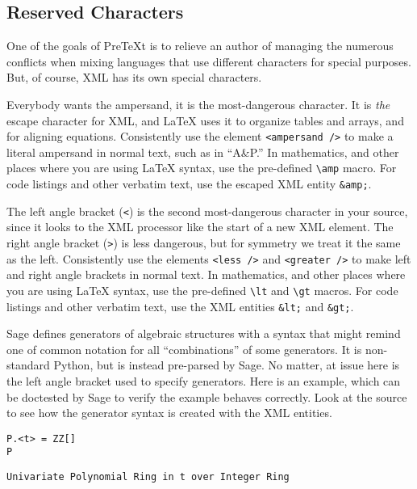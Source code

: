 \documentclass[10pt,]{article}
\theoremstyle{plain}
\theoremstyle{definition}
\theoremstyle{definition}
\theoremstyle{definition}
\theoremstyle{definition}
\theoremstyle{definition}
\theoremstyle{definition}
\numberwithin{equation}{section}
\newcommand{\lt}{<}
\newcommand{\gt}{>}
\newcommand{\amp}{&}
\begin{document}
\subsection[{Reserved Characters}]{Reserved Characters}\label{subsection-reserved-characters}
\hypertarget{p-197}{}%
One of the goals of PreTeXt is to relieve an author of managing the numerous conflicts when mixing languages that use different characters for special purposes.  But, of course, XML has its own special characters.%
\par
\hypertarget{p-198}{}%
Everybody wants the ampersand, it is the most-dangerous character.  It is \emph{the} escape character for XML, and \LaTeX{} uses it to organize tables and arrays, and for aligning equations.  Consistently use the element \lstinline?<ampersand />? to make a literal ampersand in normal text, such as in ``A\&P.''  In mathematics, and other places where you are using \LaTeX{} syntax, use the pre-defined \lstinline?\amp? macro.  For code listings and other verbatim text, use the escaped XML entity \lstinline?&amp;?.%
\par
\hypertarget{p-199}{}%
The left angle bracket (\lstinline?<?) is the second most-dangerous character in your source, since it looks to the XML processor like the start of a new XML element.  The right angle bracket (\lstinline?>?) is less dangerous, but for symmetry we treat it the same as the left.  Consistently use the elements \lstinline?<less />? and \lstinline?<greater />? to make left and right angle brackets in normal text.  In mathematics, and other places where you are using \LaTeX{} syntax, use the pre-defined \lstinline?\lt? and \lstinline?\gt? macros.  For code listings and other verbatim text, use the XML entities \lstinline?&lt;? and \lstinline?&gt;?.%
\par
\hypertarget{p-200}{}%
Sage defines generators of algebraic structures with a syntax that might remind one of common notation for all ``combinations'' of some generators.  It is non-standard Python, but is instead pre-parsed by Sage.  No matter, at issue here is the left angle bracket used to specify generators.  Here is an example, which can be doctested by Sage to verify the example behaves correctly.  Look at the source to see how the generator syntax is created with the XML entities.%
\begin{lstlisting}[style=sageinput]
P.<t> = ZZ[]
P
\end{lstlisting}
\begin{lstlisting}[style=sageoutput]
Univariate Polynomial Ring in t over Integer Ring
\end{lstlisting}
\end{document}
